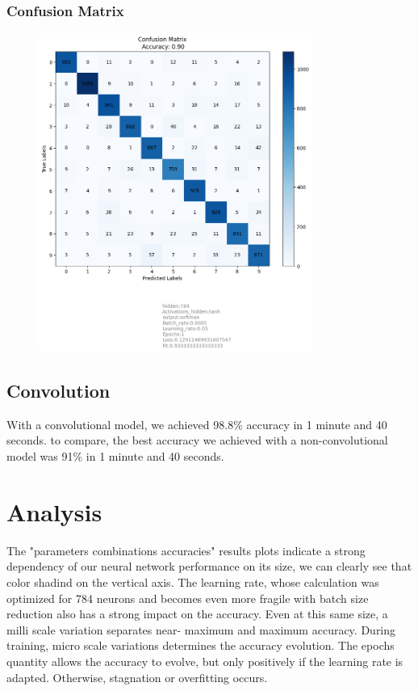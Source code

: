 \documentclass[utf8,1pt]{extarticle} %
\begin{document}
\subsubsection{Confusion Matrix}
\begin{figure}
    \centering
    \includegraphics[width=0.8\textwidth]{media/confusion/_hidden_784_Activations_hidden_tanh_output_softmax_Batch_rate_0.0005_Learning_rate_0.03_Epochs_1_Loss_0.12911469931607547_Fit_0.9333333333333333.png}
    \label{fig:confusion}
\end{figure}
\subsection{Convolution}
With a convolutional model, we achieved
98.8\% accuracy
in 1 minute and 40 seconds.
to compare, the best accuracy we achieved with a non-convolutional model was 91\% in 1 minute and 40 seconds.

\section{Analysis}
The "parameters combinations accuracies" results plots indicate a strong dependency of our
neural network performance on its 
size, we can clearly see that color shadind on the vertical axis.
The learning rate, whose calculation was optimized for 784 neurons and becomes even more fragile with batch size reduction also has a strong impact on the accuracy.
Even at this same size, a milli scale variation separates near- maximum and maximum accuracy.
During training, micro scale variations determines the accuracy evolution. 
The epochs quantity allows the accuracy to evolve, but only positively if the learning rate is adapted.
Otherwise, stagnation or overfitting occurs.
\end{document}
